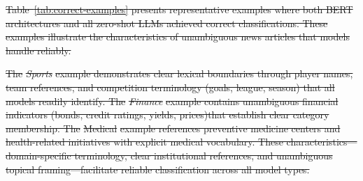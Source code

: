 \documentclass[preprint,12pt,authoryear]{elsarticle}
\newcommand{\RTL}[1]{\foreignlanguage{arabic}{#1}} %
\providecommand{\DIFdel}[1]{{\protect\color{red}\sout{#1}}}                      %
\providecommand{\DIFdelbegin}{} %
\begin{document}
\DIFdelbegin \DIFdel{Table~\ref{tab:correct-examples} presents representative examples where both BERT architectures and all zero-shot LLMs achieved correct classifications. These examples illustrate the characteristics of unambiguous news articles that models handle reliably. }%


\DIFdel{The }\textit{\DIFdel{Sports}} %
\DIFdel{example demonstrates clear lexical boundaries through player names, team references, and competition terminology (goals, league, season) that all models readily identify. The }\textit{\DIFdel{Finance}} %
\DIFdel{example contains unambiguous financial indicators (bonds, credit ratings, yields, prices)that establish clear category membership. The }%
\DIFdel{Medical}%
\DIFdel{example references preventive medicine centers and health-related initiatives with explicit medical vocabulary. These characteristics---domain-specific terminology, clear institutional references, and unambiguous topical framing---facilitate reliable classification across all model types.
}%
\end{document}
